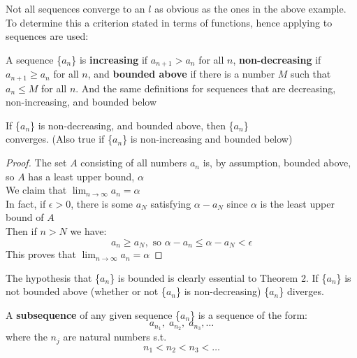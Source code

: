 Not all sequences converge to an $l$ as obvious as the ones in the above example. To determine this a criterion stated in terms of functions, hence applying to sequences are used: 

A sequence \{$a_n$\} is \textbf{increasing} if $a_{n+1} > a_n$ for all $n$, \textbf{non-decreasing} if $a_{n+1} \geq a_n$ for all $n$, and \textbf{bounded above} if there is a number $M$ such that $a_n \leq M$ for all $n$. And the same definitions for sequences that are decreasing, non-increasing, and bounded below

\begin{theorem}
    If \{$a_n$\} is non-decreasing, and bounded above, then \{$a_n$\} \\ 
    converges. (Also true if \{$a_n$\} is non-increasing and bounded below)
\end{theorem}
\begin{proof}
    The set $A$ consisting of all numbers $a_n$ is, by assumption, bounded above, so $A$ has a least upper bound, $\alpha$ \\
    We claim that $\lim_{n \to \infty}a_n = \alpha$ \\
    In fact, if $\epsilon > 0 $, there is some $a_N$ satisfying $\alpha - a_N$ since $\alpha$ is the least upper bound of $A$ \\
    Then if $n > N$ we have:
    $$ a_n \geq a_N, \text{ so  } \alpha - a_n \leq \alpha - a_N < \epsilon $$
    This proves that $\lim_{n\to \infty} a_n = \alpha$
\end{proof} \bigskip

The hypothesis that \{$a_n$\} is bounded is clearly essential to Theorem 2. If \{$a_n$\} is not bounded above (whether or not \{$a_n$\}  is non-decreasing) \{$a_n$\}  diverges. \bigskip

\begin{definition}
    A \textbf{subsequence} of any given sequence \{$a_n$\} is a sequence of the form:
    $$ a_{n_1}, \; a_{n_2}, \; a_{n_3}, \dots $$
    where the $n_j$ are natural numbers s.t.
    $$n_1 < n_2 < n_3 < \dots$$
\end{definition}

